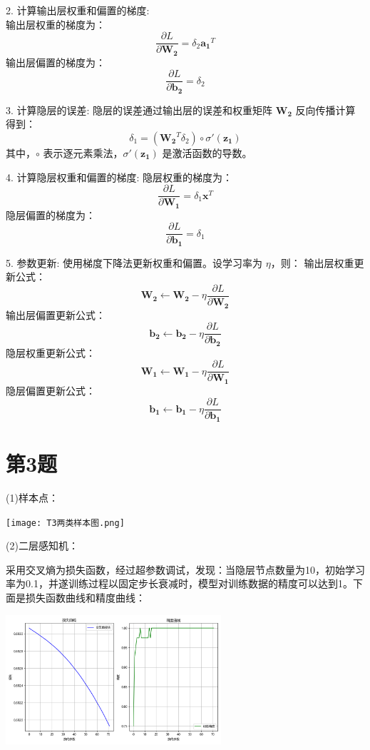 \documentclass{article}
\begin{document}
2. 计算输出层权重和偏置的梯度:\\
    输出层权重的梯度为：
    \[
    \frac{\partial L}{\partial \mathbf{W_2}} = \delta_2 \mathbf{a_1}^T
    \]
    输出层偏置的梯度为：
    \[
    \frac{\partial L}{\partial \mathbf{b_2}} = \delta_2
    \]

3. 计算隐层的误差:
    隐层的误差通过输出层的误差和权重矩阵 $\mathbf{W_2}$ 反向传播计算得到：
    \[
    \delta_1 = (\mathbf{W_2}^T \delta_2) \circ \sigma'(\mathbf{z_1})
    \]
    其中，$\circ$ 表示逐元素乘法，$\sigma'(\mathbf{z_1})$ 是激活函数的导数。

4. 计算隐层权重和偏置的梯度:
    隐层权重的梯度为：
    \[
    \frac{\partial L}{\partial \mathbf{W_1}} = \delta_1 \mathbf{x}^T
    \]
    隐层偏置的梯度为：
    \[
    \frac{\partial L}{\partial \mathbf{b_1}} = \delta_1
    \]

5. 参数更新:
    使用梯度下降法更新权重和偏置。设学习率为 $\eta$，则：
    输出层权重更新公式：
    \[
    \mathbf{W_2} \leftarrow \mathbf{W_2} - \eta \frac{\partial L}{\partial \mathbf{W_2}}
    \]
    输出层偏置更新公式：
    \[
    \mathbf{b_2} \leftarrow \mathbf{b_2} - \eta \frac{\partial L}{\partial \mathbf{b_2}}
    \]
    隐层权重更新公式：
    \[
    \mathbf{W_1} \leftarrow \mathbf{W_1} - \eta \frac{\partial L}{\partial \mathbf{W_1}}
    \]
    隐层偏置更新公式：
    \[
    \mathbf{b_1} \leftarrow \mathbf{b_1} - \eta \frac{\partial L}{\partial \mathbf{b_1}}
    \]
\section*{第3题}
(1)样本点：
\begin{center}
    \texttt{[image: T3两类样本图.png]}
    \label{fig:image2}
\end{center}

(2)二层感知机：

采用交叉熵为损失函数，经过超参数调试，发现：当隐层节点数量为10，初始学习率为0.1，并遂训练过程以固定步长衰减时，模型对训练数据的精度可以达到1。下面是损失函数曲线和精度曲线：
\begin{center}
    \includegraphics[width=0.6\textwidth]{T3(2)二层感知机.png}
    \label{fig:image3}
\end{center}
\end{document}
